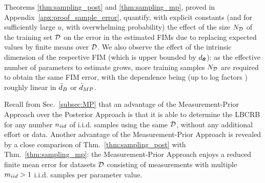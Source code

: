 {Theorems \ref{thm:sampling_post} and \ref{thm:sampling_mp}, proved in Appendix~\ref{apx:proof_sample_error}, quantify, with explicit constants (and for sufficiently large $u$, with overwhelming probability) the effect of the size $N_{\mathcal{D}}$ of the training set $\mathcal{D}$ on the error in the estimated FIMs due to replacing expected values by finite means over $\mathcal{D}$.  
We also observe
the effect of the intrinsic dimension of the respective FIM (which is upper bounded by ${d_{\bm{\theta}}}$):  as the effective number of 
parameters to estimate grows, %
more training samples $N_{\mathcal{D}}$ are required 
to obtain the same FIM error, with the dependence being (up to log factors ) roughly linear in ${\bar{d}_B}$ or ${\bar{d}_{MP}}$. 


{
Recall from Sec.~\ref{subsec:MP} that an advantage of the Measurement-Prior Approach 
over the Posterior Approach is that it is able to determine the LBCRB for any number $n_{iid}$ of i.i.d. samples using the same $\mathcal{D}$, without any additional effort or data.
Another advantage of the Measurement-Prior Approach is revealed by a close comparison
of Thm.~\ref{thm:sampling_post} with Thm.~\ref{thm:sampling_mp}:
the Measurement-Prior Approach enjoys
a reduced 
finite mean}
error for datasets $\mathcal{D}$ consisting of measurements with multiple $m_{iid} > 1$ i.i.d. samples per parameter value.
}

